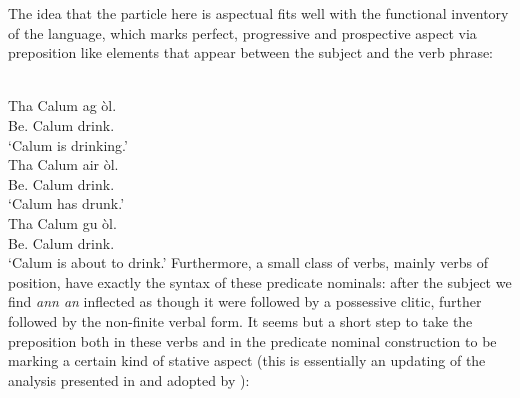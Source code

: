 \documentclass[output=paper]{langsci/langscibook}
\begin{document}


\z
The idea that the particle here is aspectual fits well with the functional
inventory of the language, which marks perfect, progressive and prospective
aspect via preposition like elements that appear between the subject and the
verb phrase:

\ea {}\\
\gll Tha Calum ag \`ol.\\
Be.\Prs{}  Calum  \Asp{}  drink.\Vn{} \\
\glt \enquote*{Calum is drinking.}
\ex {}\\
\gll Tha Calum air \`ol.\\
Be.\Prs{}  Calum  \Asp{}  drink.\Vn{} \\
\glt \enquote*{Calum has drunk.}
\ex {}\\
\gll Tha Calum gu \`ol.\\
Be.\Prs{}  Calum  \Asp{}  drink.\Vn{} \\
\glt \enquote*{Calum is about to drink.}
\z
Furthermore, a small class of verbs, mainly verbs of position, have exactly the
syntax of these predicate nominals: after the subject we find \emph{ann an}
inflected as though it were followed by a possessive clitic, further followed
by the non-finite verbal form. It seems but a short step to take the
preposition both in these verbs and in the predicate nominal construction to be marking a
certain kind of stative aspect (this is essentially an updating of the analysis
presented in \citealt{cram:83} and adopted by \citealt{schreiner:15}):
\end{document}
